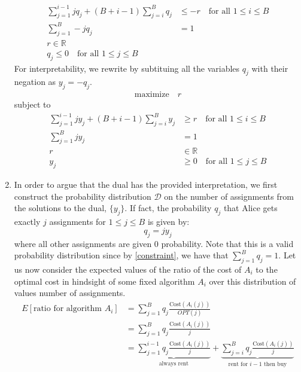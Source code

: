 \documentclass[12pt]{exam}
\begin{document}
\begin{questions}
\begin{solution}
\begin{enumerate}[label=(\alph*)]
\begin{align}
      \sum_{j=1}^{i-1} j q_j + (B + i - 1) \sum_{j = i}^B q_j &\leq -r \quad \text{for all } 1 \leq i \leq B \label{expected_constraint} \\
      \sum_{j=1}^B -j q_j & = 1 \\
      r \in \mathbb{R} \\
      q_j \leq 0 \quad \text{for all } 1 \leq j \leq B
      \end{align}
      For interpretability, we rewrite by subtituing all the variables $q_j$ with their negation as $y_j = -q_j$.
      \begin{align}
        \text{maximize} \quad r
      \end{align}
      subject to
      \begin{align}
      \sum_{j=1}^{i-1} j y_j + (B + i - 1) \sum_{j = i}^B y_j &\geq r \quad \text{for all } 1 \leq i \leq B \\
      \sum_{j=1}^B j y_j & = 1 \label{constraint} \\
      r &\in \mathbb{R} \\
      y_j &\geq 0 \quad \text{for all } 1 \leq j \leq B
      \end{align}
      \item 
        In order to argue that the dual has the provided interpretation, we first construct the probability distribution $\mathcal{D}$ on the number of assignments from the solutions to the dual, $\{y_j\}$. If fact, the probability $q_j$ that Alice gets exactly $j$ assignments for $1 \leq j \leq B$ is given by:
      \[
        q_j = jy_j
      \]
      where all other assignments are given $0$ probability. Note that this is a valid probability distribution since by \ref{constraint}, we have that $\sum_{j=1}^B q_j = 1$. Let us now consider the expected values of the ratio of the cost of $A_i$ to the optimal cost in hindsight of some fixed algorithm $A_i$ over this distribution of values number of assignments.
      \begin{align*}
        E[\text{ratio for algorithm $A_i$}] &= \sum_{j=1}^B q_j \frac{\text{Cost}(A_i(j))}{OPT(j)} \tag{Taking expectation over realized values for $j$} \\
        &= \sum_{j=1}^B  q_j \frac{\text{Cost}(A_i(j))}{j} \tag{The optimal in hindsigh is always $j$} \\
        &= \underbrace{\sum_{j=1}^{i-1}  q_j \frac{\text{Cost}(A_i(j))}{j}}_{\text{always rent}} + \underbrace{\sum_{j=i}^{B}  q_j \frac{\text{Cost}(A_i(j))}{j}}_{\text{rent for $i-1$ then buy}} \\

\end{align*}
\end{enumerate}
\end{solution}
\end{questions}
\end{document}
